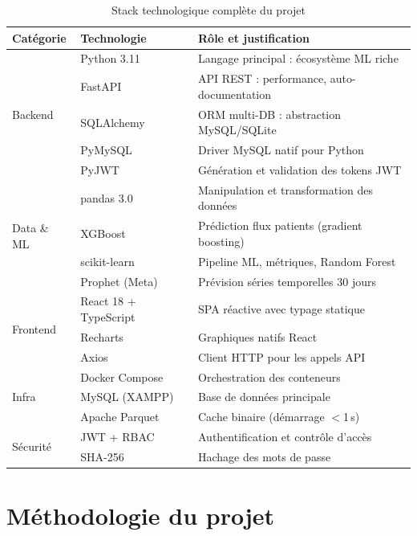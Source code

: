 \documentclass[12pt,a4paper]{report}
\begin{document}
	\begin{table}[H]
		\centering
		\caption{Stack technologique complète du projet}
		\renewcommand{\arraystretch}{1.2}
		\begin{tabularx}{\textwidth}{llX}
			\toprule
			\textbf{Catégorie} & \textbf{Technologie} & \textbf{Rôle et justification} \\
			\midrule
			\multirow{5}{*}{Backend}
			& Python 3.11       & Langage principal : écosystème ML riche \\
			& FastAPI           & API REST : performance, auto-documentation \\
			& SQLAlchemy        & ORM multi-DB : abstraction MySQL/SQLite \\
			& PyMySQL           & Driver MySQL natif pour Python \\
			& PyJWT             & Génération et validation des tokens JWT \\
			\midrule
			\multirow{4}{*}{Data \& ML}
			& pandas 3.0        & Manipulation et transformation des données \\
			& XGBoost           & Prédiction flux patients (gradient boosting) \\
			& scikit-learn      & Pipeline ML, métriques, Random Forest \\
			& Prophet (Meta)    & Prévision séries temporelles 30 jours \\
			\midrule
			\multirow{3}{*}{Frontend}
			& React 18 + TypeScript & SPA réactive avec typage statique \\
			& Recharts          & Graphiques natifs React \\
			& Axios             & Client HTTP pour les appels API \\
			\midrule
			\multirow{3}{*}{Infra}
			& Docker Compose    & Orchestration des conteneurs \\
			& MySQL (XAMPP)     & Base de données principale \\
			& Apache Parquet    & Cache binaire (démarrage $<$1\,s) \\
			\midrule
			\multirow{2}{*}{Sécurité}
			& JWT + RBAC        & Authentification et contrôle d'accès \\
			& SHA-256           & Hachage des mots de passe \\
			\bottomrule
		\end{tabularx}
	\end{table}
	\newpage
	\section{Méthodologie du projet}
	
\end{document}
